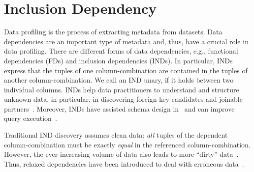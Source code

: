 \section{Inclusion Dependency}
\label{section:introduction}

Data profiling is the process of extracting metadata from datasets.
Data dependencies are an important type of metadata and, thus, have a crucial role in data profiling.
There are different forms of data dependencies, e.g., functional dependencies (FDs) and inclusion dependencies (INDs).
In particular, INDs express that the tuples of one column-combination are contained in the tuples of another column-combination. We call an IND unary, if it holds between two individual columns.
%
%
INDs help data practitioners to understand and structure unknown data, in particular, in discovering foreign key candidates and joinable partners~\cite{miller2001clio}.
Moreover, INDs have assisted schema design in~\cite{levene2000INDNF} and can improve query execution~\cite{gryz1998query}.

Traditional IND discovery assumes clean data: \emph{all} tuples of the dependent column-combination must be exactly \emph{equal} in the referenced column-combination.
However, the ever-increasing volume of data also leads to more ``dirty'' data~\cite{marsh2005dirty}.
Thus, relaxed dependencies have been introduced to deal with erroneous data~\cite{caruccio2016relaxed}.

